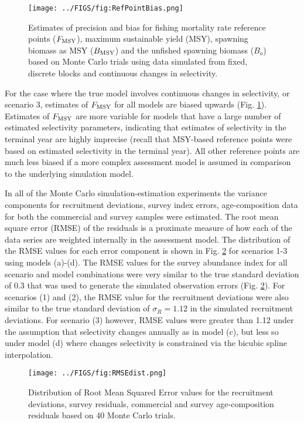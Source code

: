 \begin{figure}[!tbh]
	\begin{center}
		\texttt{[image: ../FIGS/fig:RefPointBias.png]}
	\end{center}
	\caption{Estimates of precision and bias for fishing mortality rate reference points ($F_{\rm{MSY}}$), maximum sustainable yield (MSY), spawning biomass as MSY ($B_{\rm{MSY}}$) and the unfished spawning biomass ($B_o$) based on Monte Carlo trials using data simulated from fixed, discrete blocks and continuous changes in selectivity. }
	\label{fig:RefPointBias}
\end{figure}

For the case where the true model involves continuous changes in selectivity, or scenario 3, estimates of $F_{\rm{MSY}}$ for all models are biased upwards (Fig. \ref{fig:RefPointBias}).  Estimates of $F_{\rm{MSY}}$ are more variable for models that have a large number of estimated selectivity parameters, indicating that estimates of selectivity in the terminal year are highly imprecise (recall that MSY-based reference points were based on estimated selectivity in the terminal year). All other reference points are much less biased if a more complex assessment model is assumed in comparison to the underlying simulation model.


In all of the Monte Carlo simulation-estimation experiments the variance components for recruitment deviations, survey index errors, age-composition data for both the commercial and survey samples were estimated.  The root mean square error (RMSE) of the residuals is a proximate measure of how each of the data series are weighted internally in the assessment model.   The distribution of the RMSE values for each error component is shown in Fig. \ref{fig:RMSEdist} for scenarios 1-3 using models (a)-(d).  The RMSE values for the survey abundance index for all scenario and model combinations were very similar to the true standard deviation of 0.3 that was used to generate the simulated observation errors (Fig. \ref{fig:RMSEdist}).   For scenarios (1) and (2), the RMSE value for the recruitment deviations were also similar to the true standard deviation of $\sigma_R=1.12$ in the simulated recruitment deviations.  For scenario (3) however, RMSE values were greater than 1.12 under the assumption that selectivity changes annually  as in model (c), but less so under model (d) where changes selectivity is constrained via the bicubic spline interpolation.

\begin{figure}[!tbh]
	\begin{center}
		\texttt{[image: ../FIGS/fig:RMSEdist.png]}
	\end{center}
	\caption{Distribution of Root Mean Squared Error values for the recruitment deviations, survey residuals, commercial and survey age-composition residuals based on 40 Monte Carlo trials.}
	\label{fig:RMSEdist}
\end{figure}

